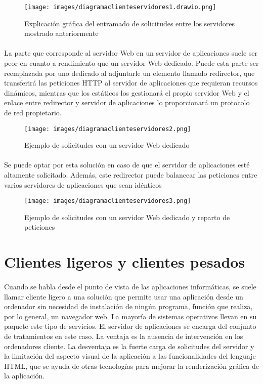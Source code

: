 \documentclass{article}
\begin{document}
	\begin{figure}[H]
		\centering
		\texttt{[image: images/diagramaclienteservidores1.drawio.png]}
		\caption{\label{fig1}Explicación gráfica del entramado de solicitudes entre los servidores mostrado anteriormente}
	\end{figure}
	
	\paragraph{}La parte que corresponde al servidor Web en un servidor de aplicaciones suele ser peor en cuanto a rendimiento que un servidor Web dedicado. Puede esta parte ser reemplazada por uno dedicado al adjuntarle un elemento llamado redirector, que transferirá las peticiones HTTP al servidor de aplicaciones que requieran recursos dinámicos, mientras que los estáticos los gestionará el propio servidor Web y el enlace entre redirector y servidor de aplicaciones lo proporcionará un protocolo de red propietario.
	
	\begin{figure}[H]
		\centering
		\texttt{[image: images/diagramaclienteservidores2.png]}
		\caption{\label{fig2}Ejemplo de solicitudes con un servidor Web dedicado}
	\end{figure}
	
	\paragraph{}Se puede optar por esta solución en caso de que el servidor de aplicaciones esté altamente solicitado. Además, este redirector puede balancear las peticiones entre varios servidores de aplicaciones que sean idénticos
	
	\begin{figure}[H]
		\centering
		\texttt{[image: images/diagramaclienteservidores3.png]}
		\caption{\label{fig3}Ejemplo de solicitudes con un servidor Web dedicado y reparto de peticiones}
	\end{figure}
	
	\section{Clientes ligeros y clientes pesados}
	
	\paragraph{}Cuando se habla desde el punto de vista de las aplicaciones informáticas, se suele llamar cliente ligero a una solución que permite usar una aplicación desde un ordenador sin necesidad de instalación de ningún programa, función que realiza, por lo general, un navegador web. La mayoría de sistemas operativos llevan en su paquete este tipo de servicios. El servidor de aplicaciones se encarga del conjunto de tratamientos en este caso. La ventaja es la ausencia de intervención en los ordenadores cliente. La desventaja es la fuerte carga de solicitudes del servidor y la limitación del aspecto visual de la aplicación a las funcionalidades del lenguaje HTML, que se ayuda de otras tecnologías para mejorar la renderización gráfica de la aplicación.
	
\end{document}
